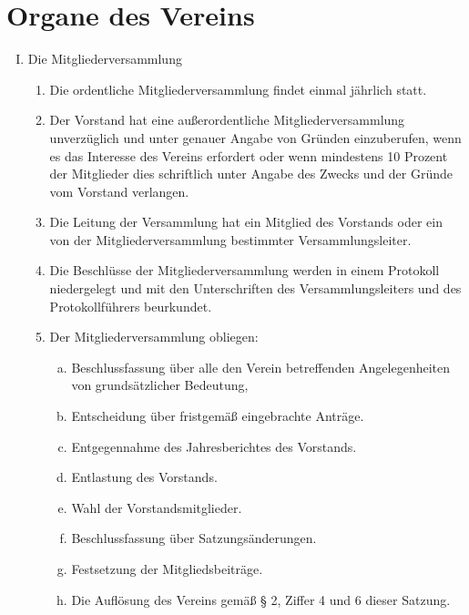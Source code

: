 \documentclass[12pt,a4paper,titlepage]{scrartcl}
\begin{document}
\section{Organe des Vereins}
\begin{enumerate}[I.]
\item Die Mitgliederversammlung 
	\begin{enumerate}[1.]
	\item Die ordentliche Mitgliederversammlung findet einmal jährlich statt. 
	\item Der Vorstand hat eine außerordentliche Mitgliederversammlung unverzüglich und 
	unter genauer Angabe von Gründen einzuberufen, wenn es das Interesse des Vereins 
	erfordert oder wenn mindestens 10 Prozent der Mitglieder dies schriftlich unter Angabe des 
	Zwecks und der Gründe vom Vorstand verlangen.
	\item Die Leitung der Versammlung hat ein Mitglied des Vorstands oder ein von der 
	Mitgliederversammlung bestimmter Versammlungsleiter. 
	\item Die Beschlüsse der Mitgliederversammlung werden in einem Protokoll niedergelegt 
	und mit den Unterschriften des Versammlungsleiters und des Protokollführers 
	beurkundet. 
	\item Der Mitgliederversammlung obliegen:
		\begin{enumerate}[a)]
		\item Beschlussfassung über alle den Verein betreffenden Angelegenheiten von 
		grundsätzlicher Bedeutung, 
		\item Entscheidung über fristgemäß eingebrachte Anträge. 
		\item Entgegennahme des Jahresberichtes des Vorstands.
		\item Entlastung des Vorstands.
		\item Wahl der Vorstandsmitglieder. 
		\item Beschlussfassung über Satzungsänderungen. 
		\item Festsetzung der Mitgliedsbeiträge.
		\item Die Auflösung des Vereins gemäß § 2, Ziffer 4 und 6 dieser Satzung.
		\end{enumerate}
 

\end{enumerate}
\end{enumerate}
\end{document}
